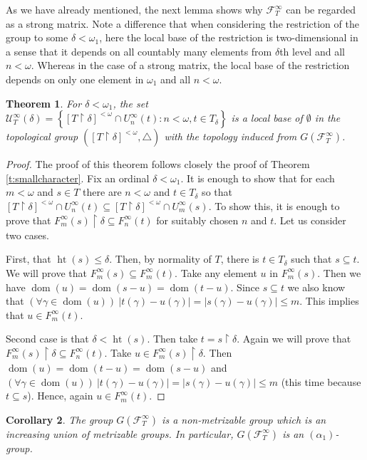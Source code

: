 \documentclass{amsart}
\theoremstyle{plain}
\newtheorem{theorem}{Theorem}[section]
\newtheorem{corollary}[theorem]{Corollary}
\theoremstyle{definition}
\numberwithin{equation}{section}
\renewcommand{\a}{\alpha}
\newcommand{\g}{\gamma}
\renewcommand{\d}{\delta}
\renewcommand{\o}{\omega}
\newcommand{\ps}{\emptyset}
\newcommand{\rest}{\upharpoonright}
\newcommand{\sst}{\subseteq}
\newcommand{\cu}{\mathcal U}
\newcommand{\ft}{\mathcal F^{\infty}_T}
\newcommand{\set}[1]{\left\{#1\right\}}
\newcommand{\abs}[1]{\left\vert#1\right\vert}
\newcommand{\dom}{\operatorname{dom}}
\newcommand{\h}{\operatorname{ht}}
\begin{document}
As we have already mentioned, the next lemma shows why $\ft$ can be regarded as a strong matrix.
Note a difference that when considering the restriction of the group to some $\d<\o_1$, here the local base of the restriction is two-dimensional in a sense that it depends on all countably many elements from $\d$th level and all $n<\o$.
Whereas in the case of a strong matrix, the local base of the restriction depends on only one element in $\o_1$ and all $n<\o$.

\begin{theorem}\label{t:treealt-strong}
	For $\d<\o_1$, the set $\cu^{\infty}_{T}(\d)=\set{[T\rest\d]^{<\o}\cap U^{\infty}_n(t):n<\o,t\in T_{\d}}$ is a local base of $\ps$ in the topological group $([T\rest\d]^{<\o},\triangle)$ with the topology induced from $G(\ft)$.
\end{theorem}
\begin{proof}
	The proof of this theorem follows closely the proof of Theorem \ref{t:smallcharacter}.
	Fix an ordinal $\d<\o_1$.
    It is enough to show that for each $m<\o$ and $s\in T$ there are $n<\o$ and $t\in T_{\d}$ so that $[T\rest\d]^{<\o}\cap U^{\infty}_n(t)\sst [T\rest\d]^{<\o}\cap U^{\infty}_m(s).$
    To show this, it is enough to prove that $F^{\infty}_m(s)\rest\d\sst F^{\infty}_n(t)$ for suitably chosen $n$ and $t$.
    Let us consider two cases.

    First, that $\h(s)\le\d$.
	Then, by normality of $T$, there is $t\in T_{\d}$ such that $s\sst t$.
	We will prove that $F^{\infty}_m(s)\sst F^{\infty}_m(t)$.
	Take any element $u$ in $F^{\infty}_m(s)$.
	Then we have $\dom(u)=\dom(s-u)=\dom(t-u)$.
	Since $s\sst t$ we also know that $(\forall \g\in\dom(u))\ \abs{t(\g)-u(\g)}=\abs{s(\g)-u(\g)}\le m$.
	This implies that $u\in F^{\infty}_m(t)$.

	Second case is that $\d<\h(s)$.
	Then take $t=s\rest\d$.
	Again we will prove that $F^{\infty}_m(s)\rest\d\sst F^{\infty}_n(t)$.
	Take $u\in F^{\infty}_m(s)\rest\d$.
	Then $\dom(u)=\dom(t-u)=\dom(s-u)$ and $(\forall \g\in\dom(u))\ \abs{t(\g)-u(\g)}=\abs{s(\g)-u(\g)}\le m$ (this time because $t\sst s$).
	Hence, again $u\in F^{\infty}_m(t)$.
\end{proof}

\begin{corollary}\label{c:treealtnonm}
	The group $G(\ft)$ is a non-metrizable group which is an increasing union of metrizable groups. In particular, $G(\ft)$ is an $(\a_1)$-group.
\end{corollary}
\end{document}
